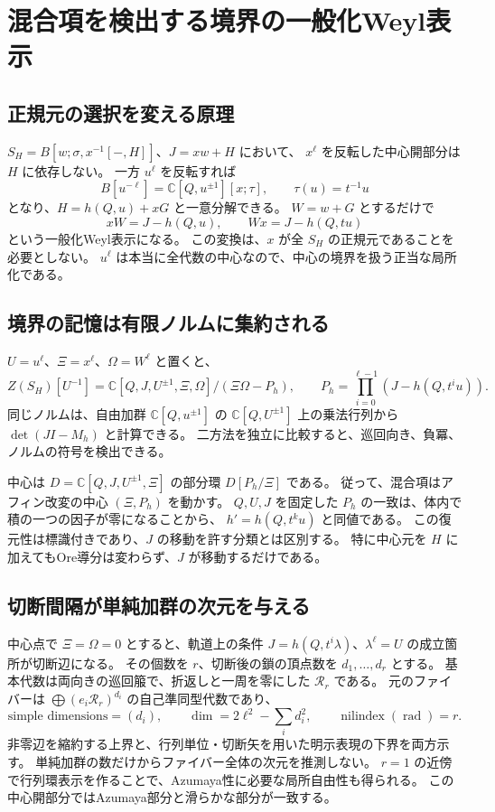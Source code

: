 \section{混合項を検出する境界の一般化Weyl表示}
\label{sec:boundary-notes-v39}

\subsection{正規元の選択を変える原理}
$S_H=B[w;\sigma,x^{-1}[-,H]]$、$J=xw+H$ において、
$x^\ell$ を反転した中心開部分は $H$ に依存しない。
一方 $u^\ell$ を反転すれば
\[
 B[u^{-\ell}]=\mathbb C[Q,u^{\pm1}][x;\tau],\qquad
 \tau(u)=t^{-1}u
\]
となり、$H=h(Q,u)+xG$ と一意分解できる。
$W=w+G$ とするだけで
\[
 xW=J-h(Q,u),\qquad Wx=J-h(Q,tu)
\]
という一般化Weyl表示になる。
この変換は、$x$ が全 $S_H$ の正規元であることを必要としない。
$u^\ell$ は本当に全代数の中心なので、中心の境界を扱う正当な局所化である。

\subsection{境界の記憶は有限ノルムに集約される}
$U=u^\ell$、$\Xi=x^\ell$、$\Omega=W^\ell$ と置くと、
\[
 Z(S_H)[U^{-1}]
 =\mathbb C[Q,J,U^{\pm1},\Xi,\Omega]/(\Xi\Omega-P_h),\qquad
 P_h=\prod_{i=0}^{\ell-1}(J-h(Q,t^iu)).
\]
同じノルムは、自由加群 $\mathbb C[Q,u^{\pm1}]$ の
$\mathbb C[Q,U^{\pm1}]$ 上の乗法行列から $\det(JI-M_h)$ と計算できる。
二方法を独立に比較すると、巡回向き、負冪、ノルムの符号を検出できる。

中心は $D=\mathbb C[Q,J,U^{\pm1},\Xi]$ の部分環 $D[P_h/\Xi]$ である。
従って、混合項はアフィン改変の中心 $(\Xi,P_h)$ を動かす。
$Q,U,J$ を固定した $P_h$ の一致は、体内で積の一つの因子が零になることから、
$h'=h(Q,t^ku)$ と同値である。
この復元性は標識付きであり、$J$ の移動を許す分類とは区別する。
特に中心元を $H$ に加えてもOre導分は変わらず、$J$ が移動するだけである。

\subsection{切断間隔が単純加群の次元を与える}
中心点で $\Xi=\Omega=0$ とすると、軌道上の条件
$J=h(Q,t^i\lambda)$、$\lambda^\ell=U$ の成立箇所が切断辺になる。
その個数を $r$、切断後の鎖の頂点数を $d_1,\ldots,d_r$ とする。
基本代数は両向きの巡回箙で、折返しと一周を零にした $\mathcal R_r$ である。
元のファイバーは $\bigoplus(e_i\mathcal R_r)^{d_i}$ の自己準同型代数であり、
\[
 \text{simple dimensions}=(d_i),\qquad
 \dim=2\ell^2-\sum_i d_i^2,\qquad
 \operatorname{nilindex}(\operatorname{rad})=r.
\]
非零辺を縮約する上界と、行列単位・切断矢を用いた明示表現の下界を両方示す。
単純加群の数だけからファイバー全体の次元を推測しない。
$r=1$ の近傍で行列環表示を作ることで、Azumaya性に必要な局所自由性も得られる。
この中心開部分ではAzumaya部分と滑らかな部分が一致する。

